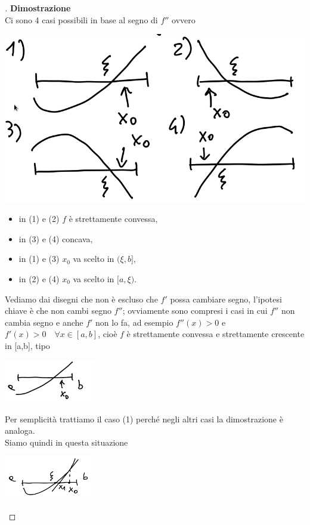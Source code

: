 \begin{proof}[\unskip\nopunct]
\textbf{Dimostrazione}\\
Ci sono 4 casi possibili in base al segno di $f''$ ovvero
\begin{center}
    \includegraphics[scale=0.4]{foto/pagina11_1}
\end{center}
\begin{itemize}
    \item in (1) e (2) $f$ è strettamente convessa,
    \item in (3) e (4) concava,
    \item in (1) e (3) $x_0$ va scelto in $(\xi,b]$,
    \item in (2) e (4) $x_0 $ va scelto in $[a,\xi)$.
\end{itemize}
Vediamo dai disegni che non è escluso che $f'$ possa cambiare segno, l'ipotesi chiave è che non cambi segno $f''$; ovviamente sono compresi i casi in cui $f''$ non cambia segno e anche $f'$ non lo fa, ad esempio $f''(x) > 0$ e $f'(x) > 0 \quad \forall x \in [a,b]$, cioè $f$ è strettamente convessa e strettamente crescente in [a,b], tipo\\
\begin{center}
\includegraphics[width=0.3\textwidth]{foto/pagina12_1}
\end{center}
Per semplicità trattiamo il caso (1) perché negli altri casi la dimostrazione è analoga. \\
Siamo quindi in questa situazione\\
\begin{center}
\includegraphics[width=0.3\textwidth]{foto/pagina12_2}

\end{center}
\end{proof}
